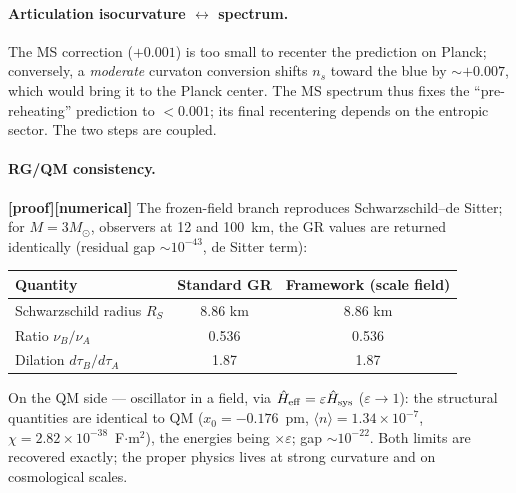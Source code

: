 \documentclass[11pt,a4paper]{article}
\newcommand{\st}[1]{\textbf{\textcolor{blue!45!black}{[#1]}}}
\begin{document}
\paragraph{Articulation isocurvature $\leftrightarrow$ spectrum.} The MS correction ($+0.001$) is too small to recenter the prediction on Planck; conversely, a \emph{moderate} curvaton conversion shifts $n_s$ toward the blue by $\sim+0.007$, which would bring it to the Planck center. The MS spectrum thus fixes the ``pre-reheating'' prediction to $<0.001$; its final recentering depends on the entropic sector. The two steps are coupled.

\paragraph{RG/QM consistency.}
\st{proof}\st{numerical} The frozen-field branch reproduces Schwarzschild--de Sitter; for $M=3M_\odot$, observers at 12 and 100~km, the GR values are returned identically (residual gap $\sim10^{-43}$, de Sitter term):
\begin{center}\small
\begin{tabular}{lcc}
\toprule
Quantity & Standard GR & Framework (scale field) \\
\midrule
Schwarzschild radius $R_S$ & 8.86 km & 8.86 km \\
Ratio $\nu_B/\nu_A$ & 0.536 & 0.536 \\
Dilation $d\tau_B/d\tau_A$ & 1.87 & 1.87 \\
\bottomrule
\end{tabular}
\end{center}
On the QM side --- oscillator in a field, via $\hat H_{\rm eff}=\varepsilon\hat H_{\rm sys}$ ($\varepsilon\to1$): the structural quantities are identical to QM ($x_0=-0.176$~pm, $\langle n\rangle=1.34\times10^{-7}$, $\chi=2.82\times10^{-38}$~F$\cdot$m$^2$), the energies being $\times\varepsilon$; gap $\sim10^{-22}$. Both limits are recovered exactly; the proper physics lives at strong curvature and on cosmological scales.
\end{document}
